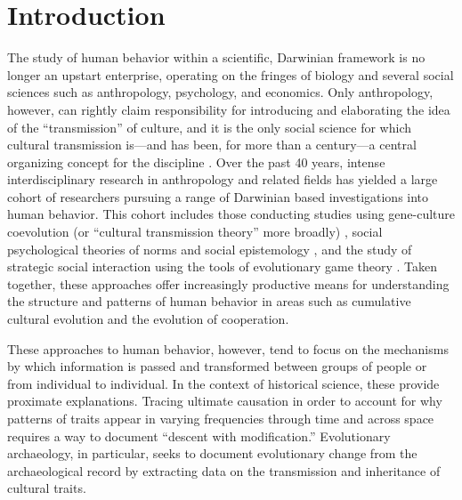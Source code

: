 \section{Introduction}
\label{sec:introduction}
The study of human behavior within a scientific, Darwinian framework is no longer an upstart enterprise, operating on the fringes of biology and several social sciences such as anthropology, psychology, and economics. Only anthropology, however, can rightly claim responsibility for introducing and elaborating the idea of the “transmission” of culture, and it is the only social science for which cultural transmission is—and has been, for more than a century—a central organizing concept for the discipline \citep{lyman2008cultural}. Over the past 40 years, intense interdisciplinary research in anthropology and related fields has yielded a large cohort of researchers pursuing a range of Darwinian based investigations into human behavior. This cohort includes those conducting studies using gene-culture coevolution (or “cultural transmission theory” more broadly) , social psychological theories of norms and social epistemology , and the study of strategic social interaction using the tools of evolutionary game theory . Taken together, these approaches offer increasingly productive means for understanding the structure and patterns of human behavior in areas such as cumulative cultural evolution and the evolution of cooperation. 

These approaches to human behavior, however, tend to focus on the mechanisms by which information is passed and transformed between groups of people or from individual to individual.  In the context of historical science, these provide proximate explanations.   Tracing ultimate causation in order to account for why patterns of traits appear in varying frequencies through time and across space requires a way to document ``descent with modification.''  Evolutionary archaeology, in particular, seeks to document evolutionary change from the archaeological record by extracting data on the transmission and inheritance of cultural traits.  


